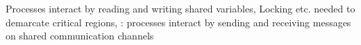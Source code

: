 \documentclass[landscape, a4paper]{article}
\begin{document}
\begin{minipage}[t]{0.195\linewidth}
\begin{betterlist}
Processes interact by reading and writing shared variables, Locking etc. needed to demarcate critical regions, : processes interact by sending and receiving messages on shared communication channels
	\end{betterlist}
	\begin{betterlist}

\end{betterlist}
\end{minipage}
\end{document}
